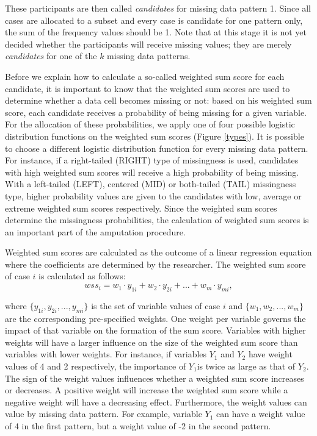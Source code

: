 \documentclass[11pt,a4paper]{article}
\begin{document}
\noindent These participants are then called \textit{candidates} for missing data pattern 1. Since all cases are allocated to a subset and every case is candidate for one pattern only, the sum of the frequency values should be 1. Note that at this stage it is not yet decided whether the participants will receive missing values; they are merely \textit{candidates} for one of the $k$ missing data patterns.  

Before we explain how to calculate a so-called weighted sum score for each candidate, it is important to know that the weighted sum scores are used to determine whether a data cell becomes missing or not: based on his weighted sum score, each candidate receives a probability of being missing for a given variable. For the allocation of these probabilities, we apply one of four possible logistic distribution functions on the weighted sum scores (Figure \ref{types}). It is possible to choose a different logistic distribution function for every missing data pattern. For instance, if a right-tailed (RIGHT) type of missingness is used, candidates with high weighted sum scores will receive a high probability of being missing. With a left-tailed (LEFT), centered (MID) or both-tailed (TAIL) missingness type, higher probability values are given to the candidates with low, average or extreme weighted sum scores respectively. Since the weighted sum scores determine the  missingness probabilities, the calculation of weighted sum scores is an important part of the amputation procedure. 

Weighted sum scores are calculated as the outcome of a linear regression equation where the coefficients are determined by the researcher. The weighted sum score of case $i$ is calculated as follows:
\begin{equation*}
wss_i = w_1 \cdot y_{1i} + w_2 \cdot y_{2i} + ... + w_m \cdot y_{mi},
\end{equation*}

\noindent where $\{y_{1i}, y_{2i}, ..., y_{mi}\}$ is the set of variable values of case $i$ and $\{w_1, w_2, ..., w_m\}$ are the corresponding pre-specified weights. One weight per variable governs the impact of that variable on the formation of the sum score. Variables with higher weights will have a larger influence on the size of the weighted sum score than variables with lower weights. For instance, if variables $Y_1$ and $Y_2$ have weight values of 4 and 2 respectively, the importance of $Y_1$is twice as large as that of $Y_2$. The sign of the weight values influences whether a weighted sum score increases or decreases. A positive weight will increase the weighted sum score while a negative weight will have a decreasing effect. Furthermore, the weight values can value by missing data pattern. For example, variable $Y_1$ can have a weight value of 4 in the first pattern, but a weight value of -2 in the second pattern. 
\end{document}
